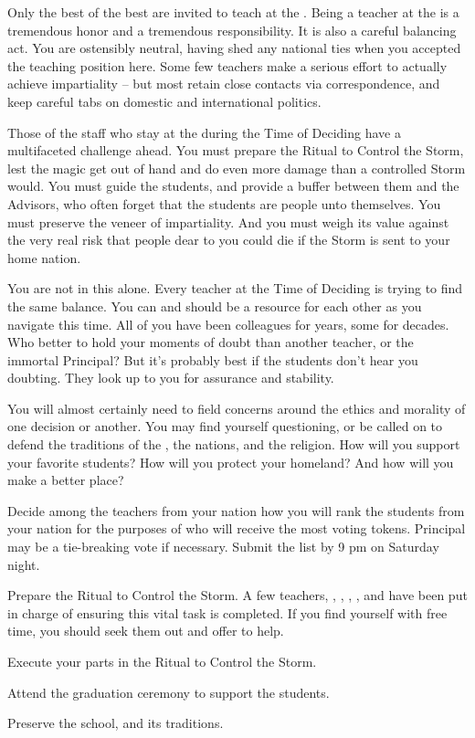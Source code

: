 \documentclass[blue]{GL2020}
\begin{document}
\name{\bTeacherBlue{}}

Only the best of the best are invited to teach at the \pSchool{}. Being a teacher at the \pSc{} is a tremendous honor and a tremendous responsibility. It is also a careful balancing act. You are ostensibly neutral, having shed any national ties when you accepted the teaching position here. Some few teachers make a serious effort to actually achieve impartiality -- but most retain close contacts via correspondence, and keep careful tabs on domestic and international politics.

Those of the staff who stay at the \pSc{} during the Time of Deciding have a multifaceted challenge ahead. You must prepare the Ritual to Control the Storm, lest the magic get out of hand and do even more damage than a controlled Storm would. You must guide the students, and provide a buffer between them and the Advisors, who often forget that the students are people unto themselves. You must preserve the veneer of impartiality. And you must weigh its value against the very real risk that people dear to you could die if the Storm is sent to your home nation.

You are not in this alone. Every teacher at the Time of Deciding is trying to find the same balance. You can and should be a resource for each other as you navigate this time. All of you have been colleagues for years, some for decades. Who better to hold your moments of doubt than another teacher, or the immortal Principal? But it's probably best if the students don't hear you doubting. They look up to you for assurance and stability.

You will almost certainly need to field concerns around the ethics and morality of one decision or another. You may find yourself questioning, or be called on to defend the traditions of the \pSc{}, the nations, and the religion. How will you support your favorite students? How will you protect your homeland? And how will you make \pEarth{} a better place?

\begin{itemz}[Goals]
	\item Decide among the teachers from your nation how you will rank the students from your nation for the purposes of who will receive the most voting tokens. Principal \cPrincipal{} may be a tie-breaking vote if necessary. Submit the list by 9 pm on Saturday night.
	\item Prepare the Ritual to Control the Storm. A few teachers, \cFlowPriest{}, \cMusic{}, \cHistory{}, \cLibrarian{}, and \cBeetle{} have been put in charge of ensuring this vital task is completed. If you find yourself with free time, you should seek them out and offer to help.
	\item Execute your parts in the Ritual to Control the Storm.
	\item Attend the graduation ceremony to support the students.
	\item Preserve the school, and its traditions.
\end{itemz}
\end{document}
